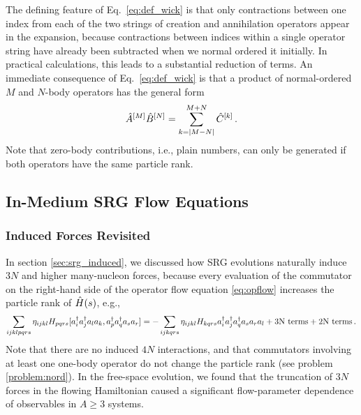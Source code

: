 The defining feature of Eq.~\eqref{eq:def_wick} is that only contractions 
between one index from each of the two strings of creation and annihilation
operators appear in the expansion, because contractions between indices 
within a single operator string have already been subtracted when we normal 
ordered it initially. In practical calculations, this leads to a substantial 
reduction of terms. An immediate consequence of Eq.~\eqref{eq:def_wick} is 
that a product of normal-ordered $M$ and $N$-body operators has the general 
form
\begin{equation}\label{eq:wick_product_schematic}
  \AO^{[M]}\BO^{[N]} = \sum_{k=|M-N|}^{M+N}\CO^{[k]}\,.
\end{equation}
Note that zero-body contributions, i.e., plain numbers, can only be generated 
if both operators have the same particle rank.

\subsection{\label{sec:imsrg_flow}In-Medium SRG Flow Equations}

%
%
\subsubsection{Induced Forces Revisited}
In section \ref{sec:srg_induced}, we discussed how SRG evolutions naturally
induce $3N$ and higher many-nucleon forces, because every evaluation of 
the commutator on the right-hand side of the operator flow equation 
\eqref{eq:opflow} increases the particle rank of $\hat{H}(s)$, e.g.,
\begin{equation}\label{eq:induced_3N}
  \sum_{ijklpqrs}\eta_{ijkl}H_{pqrs}\comm{\aaO_{i}\aaO_{j}\aO_{l}\aO_{k}}{\aaO_{p}\aaO_{q}\aO_{s}\aO_{r}}
    = -\sum_{ijkqrs}\eta_{ijkl}H_{kqrs} \aaO_{i}\aaO_{j}\aaO_{q}\aO_{s}\aO_{r}\aO_{l} + \text{3N terms} + \text{2N terms}\,.
\end{equation}
Note that there are no induced $4N$ interactions, and that commutators
involving at least one one-body operator do not change the particle rank
(see problem \ref{problem:nord}). In the free-space evolution, we 
found that the truncation of $3N$ forces in the flowing Hamiltonian caused
a significant flow-parameter dependence of observables in $A\geq 3$ systems.

